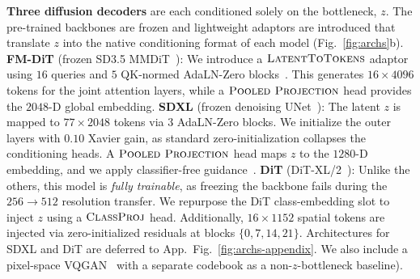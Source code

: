 \documentclass{article}
\begin{document}
\textbf{Three diffusion decoders} are each conditioned solely on the bottleneck, $z$. The pre-trained backbones are frozen and lightweight adaptors are introduced that translate $z$ into the native conditioning format of each model (Fig.~\ref{fig:archs}b). \textbf{FM-DiT} (frozen SD3.5 MMDiT~\citep{esser2024sd3}): We introduce a $\textsc{LatentToTokens}$ adaptor using $16$ queries and $5$ QK-normed AdaLN-Zero blocks~\citep{peebles2023dit}. This generates $16{\times}4096$ tokens for the joint attention layers, while a $\textsc{Pooled Projection}$ head provides the $2048$-D global embedding. \textbf{SDXL} (frozen denoising UNet~\citep{podell2023sdxl}): The latent $z$ is mapped to $77{\times}2048$ tokens via $3$ AdaLN-Zero blocks. We initialize the outer layers with $0.10$ Xavier gain, as standard zero-initialization collapses the conditioning heads. A $\textsc{Pooled Projection}$ head maps $z$ to the $1280$-D embedding, and we apply classifier-free guidance~\citep{ho2022cfg}. \textbf{DiT} (DiT-XL/2~\citep{peebles2023dit}): Unlike the others, this model is \emph{fully trainable}, as freezing the backbone fails during the $256{\to}512$ resolution transfer. We repurpose the DiT class-embedding slot to inject $z$ using a $\textsc{ClassProj}$ head. Additionally, $16{\times}1152$ spatial tokens are injected via zero-initialized residuals at blocks $\{0,7,14,21\}$. Architectures for SDXL and DiT are deferred to App.~Fig.~\ref{fig:archs-appendix}. We also include a pixel-space VQGAN~\citep{esser2021vqgan} with a separate codebook as a non-$z$-bottleneck baseline).
\end{document}
